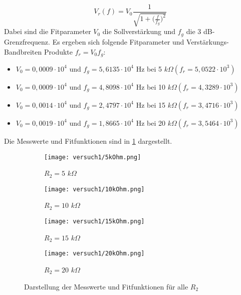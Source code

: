\begin{equation}\label{eqn:formel2}
    V_r(f)=V_0\frac{1}{\sqrt{1+\biggl(\frac{f}{f_g}\biggr)^2}}
\end{equation}
Dabei sind die Fitparameter $V_0$ die Sollverstärkung und $f_g$ die 3 dB-Grenzfrequenz. Es ergeben sich folgende Fitparameter und Verstärkungs-Bandbreiten Produkte $f_r=V_0f_g$:
\begin{itemize}[noitemsep,nosep]
	\item $V_0=0,0009 \cdot10^4$ und $f_g=5,6135 \cdot10^4$ Hz bei 5 $k\Omega (f_r=5,0522 \cdot 10^3)$
	\item $V_0=0,0009 \cdot10^4$ und $f_g=4,8098 \cdot10^4$ Hz bei 10 $k\Omega (f_r=4,3289 \cdot 10^3)$
	\item $V_0=0,0014 \cdot10^4$ und $f_g=2,4797 \cdot10^4$ Hz bei 15 $k\Omega (f_r=3,4716 \cdot 10^3)$
	\item $V_0=0,0019 \cdot10^4$ und $f_g=1,8665 \cdot10^4$ Hz bei 20 $k\Omega (f_r=3,5464 \cdot 10^3)$
\end{itemize}
Die Messwerte und Fitfunktionen sind in \ref{fig:graphen} dargestellt.
\begin{figure}
    \centering
    \begin{subfigure}[t]{0.45\linewidth}
        \centering
		\texttt{[image: versuch1/5kOhm.png]}
		\caption{$R_2=5$ $k \Omega$}
    \end{subfigure}
\hfill
     \begin{subfigure}[t]{0.45\linewidth}
        \centering
		\texttt{[image: versuch1/10kOhm.png]}
		\caption{$R_2=10$ $k \Omega$}
    \end{subfigure}

     \begin{subfigure}[t]{0.45\linewidth}
        \centering
		\texttt{[image: versuch1/15kOhm.png]}
		\caption{$R_2=15$ $k \Omega$}
    \end{subfigure}
\hfill
     \begin{subfigure}[t]{0.45\linewidth}
        \centering
		\texttt{[image: versuch1/20kOhm.png]}
		\caption{$R_2=20$ $k \Omega$}
    \end{subfigure}
    \caption{Darstellung der Messwerte und Fitfunktionen für alle $R_2$}
    \label{fig:graphen}
\end{figure}